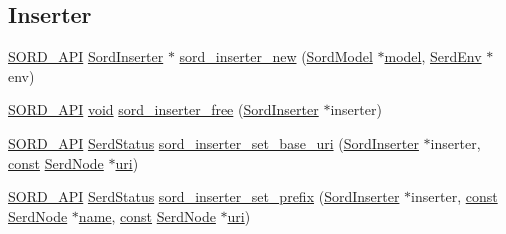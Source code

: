 \subsection*{Inserter}
\begin{DoxyCompactItemize}
\item 
\hyperlink{sord_8h_a1a2e27663366eb6ff41e062a0a880f48}{S\+O\+R\+D\+\_\+\+A\+PI} \hyperlink{group__sord_ga766743eaebfadb5a5a5d94af6226eb75}{Sord\+Inserter} $\ast$ \hyperlink{group__sord_gabc6475c35efee1928bf84be7ba248b69}{sord\+\_\+inserter\+\_\+new} (\hyperlink{group__sord_gaea018cfebfedd10280b1d8dd6d650a28}{Sord\+Model} $\ast$\hyperlink{lib_2expat_8h_ac517f0c27408fbd365e7dd34e032faca}{model}, \hyperlink{group__serd_gaea4226dd80abea7afa05986f195d4755}{Serd\+Env} $\ast$env)
\item 
\hyperlink{sord_8h_a1a2e27663366eb6ff41e062a0a880f48}{S\+O\+R\+D\+\_\+\+A\+PI} \hyperlink{sound_8c_ae35f5844602719cf66324f4de2a658b3}{void} \hyperlink{group__sord_gaeb4b9a6c189853b1ca4f589933014744}{sord\+\_\+inserter\+\_\+free} (\hyperlink{group__sord_ga766743eaebfadb5a5a5d94af6226eb75}{Sord\+Inserter} $\ast$inserter)
\item 
\hyperlink{sord_8h_a1a2e27663366eb6ff41e062a0a880f48}{S\+O\+R\+D\+\_\+\+A\+PI} \hyperlink{group__serd_ga104d544e48b6282ef2447bb3ac7c330d}{Serd\+Status} \hyperlink{group__sord_gaf319ea2490efb4721170e544791d130f}{sord\+\_\+inserter\+\_\+set\+\_\+base\+\_\+uri} (\hyperlink{group__sord_ga766743eaebfadb5a5a5d94af6226eb75}{Sord\+Inserter} $\ast$inserter, \hyperlink{getopt1_8c_a2c212835823e3c54a8ab6d95c652660e}{const} \hyperlink{struct_serd_node}{Serd\+Node} $\ast$\hyperlink{lib_2expat_8h_a5a9fdd6c2606370ad12f24c078ac6585}{uri})
\item 
\hyperlink{sord_8h_a1a2e27663366eb6ff41e062a0a880f48}{S\+O\+R\+D\+\_\+\+A\+PI} \hyperlink{group__serd_ga104d544e48b6282ef2447bb3ac7c330d}{Serd\+Status} \hyperlink{group__sord_ga0123e49d8644f57361fcd95f7ee0f178}{sord\+\_\+inserter\+\_\+set\+\_\+prefix} (\hyperlink{group__sord_ga766743eaebfadb5a5a5d94af6226eb75}{Sord\+Inserter} $\ast$inserter, \hyperlink{getopt1_8c_a2c212835823e3c54a8ab6d95c652660e}{const} \hyperlink{struct_serd_node}{Serd\+Node} $\ast$\hyperlink{lib_2expat_8h_a1b49b495b59f9e73205b69ad1a2965b0}{name}, \hyperlink{getopt1_8c_a2c212835823e3c54a8ab6d95c652660e}{const} \hyperlink{struct_serd_node}{Serd\+Node} $\ast$\hyperlink{lib_2expat_8h_a5a9fdd6c2606370ad12f24c078ac6585}{uri})
\item 

\end{DoxyCompactItemize}
